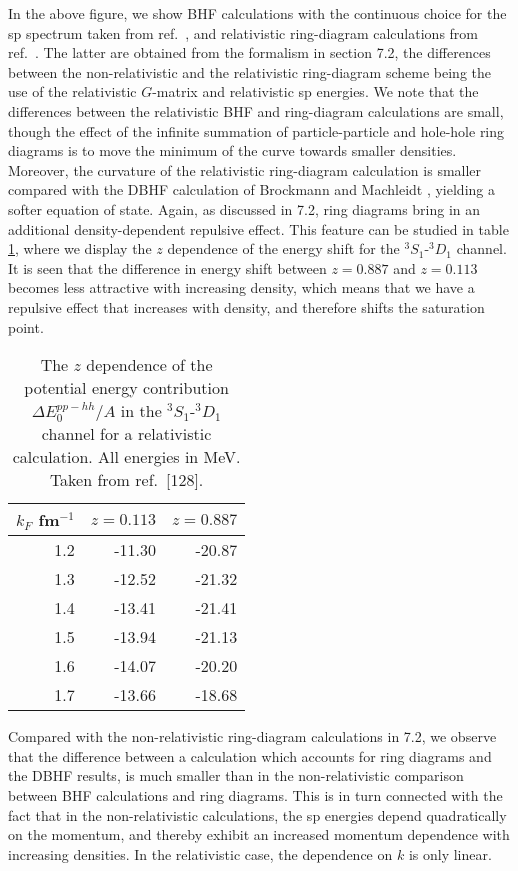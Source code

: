 In the above figure, we show BHF calculations with the continuous choice 
for the sp spectrum taken from ref.\ \cite{bm90}, and
relativistic ring-diagram calculations from ref.\ \cite{jkm93}. The
latter are obtained from the formalism in section 7.2, the differences
between the non-relativistic and the relativistic ring-diagram
scheme being the use of the relativistic $G$-matrix and relativistic
sp energies. 
We note that the differences between 
the relativistic BHF and ring-diagram calculations are small, though the
effect of the infinite summation of particle-particle and hole-hole
ring diagrams is to move the minimum of the curve towards smaller densities.
Moreover, the curvature of the relativistic ring-diagram calculation
is smaller compared with the DBHF calculation of Brockmann and Machleidt
\cite{bm90}, yielding a softer equation of state.
Again, as discussed in 7.2, ring diagrams bring in an additional 
density-dependent repulsive effect. This feature can be studied in
table \ref{tab:rings4}, where we display the $z$ dependence of
the energy shift for the $^3S_1$-$^3D_1$ channel. It is seen that the
difference in energy shift between $z=0.887$ and $z=0.113$ 
becomes less attractive with increasing density, which means that we
have a repulsive effect that increases with density, and therefore shifts
the saturation point.
\begin{table}[hbtp]
\caption{The $z$ dependence of the potential energy
contribution
$\Delta E_0^{pp-hh}/A$ in the $^{3}S_1$-$^{3}D_1$ channel
for a relativistic calculation. All energies in MeV. Taken from
ref.\ [128].}
\begin{center}
\begin{tabular}{rrr}
\\\hline
\multicolumn{1}{c}{$k_F$ fm$^{-1}$}&
\multicolumn{1}{c}{$z=0.113$}&
\multicolumn{1}{c}{$z=0.887$}
\\ \hline
1.2&-11.30&-20.87\\
1.3&-12.52&-21.32\\
1.4&-13.41&-21.41\\
1.5&-13.94&-21.13\\
1.6&-14.07&-20.20\\
1.7&-13.66&-18.68\\
\hline
\end{tabular}
\end{center}
\label{tab:rings4}
\end{table}

Compared with the non-relativistic ring-diagram calculations in 7.2,
we observe that the difference between a calculation which accounts
for ring diagrams and the DBHF results, is much smaller
than in the non-relativistic comparison between BHF calculations
and ring diagrams. This is in turn connected with the fact that
in the non-relativistic calculations, the sp energies depend
quadratically on the momentum, and thereby exhibit an increased
momentum dependence with increasing densities. In the relativistic
case, the dependence on $k$ is only linear.

